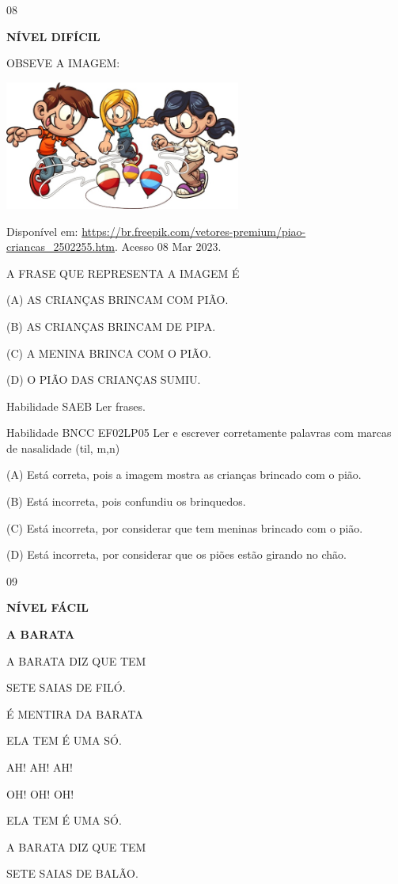 {{\num{08}

\textbf{NÍVEL DIFÍCIL}

OBSEVE A IMAGEM:

\includegraphics[width=3.05095in,height=1.66841in]{media/image144.jpeg}

Disponível em:
\url{https://br.freepik.com/vetores-premium/piao-criancas_2502255.htm}.
Acesso 08 Mar 2023.

A FRASE QUE REPRESENTA A IMAGEM É

(A) AS CRIANÇAS BRINCAM COM PIÃO.

(B) AS CRIANÇAS BRINCAM DE PIPA.

(C) A MENINA BRINCA COM O PIÃO.

(D) O PIÃO DAS CRIANÇAS SUMIU.

Habilidade SAEB Ler frases.

Habilidade BNCC EF02LP05 Ler e escrever corretamente palavras com marcas
de nasalidade (til, m,n)

(A) Está correta, pois a imagem mostra as crianças brincado com o pião.

(B) \protect\hypertarget{_Hlk129156663}{}{}Está incorreta, pois
confundiu os brinquedos.

(C) Está incorreta, por considerar que tem meninas brincado com o pião.

(D) Está incorreta, por considerar que os piões estão girando no chão.

\num{09}

\textbf{NÍVEL FÁCIL}

\textbf{A BARATA}

A BARATA DIZ QUE TEM

SETE SAIAS DE FILÓ.

É MENTIRA DA BARATA

ELA TEM É UMA SÓ.

AH! AH! AH!

OH! OH! OH!

ELA TEM É UMA SÓ.

A BARATA DIZ QUE TEM

SETE SAIAS DE BALÃO.

}}

